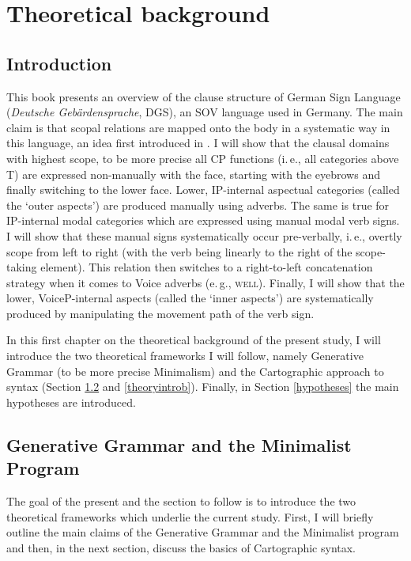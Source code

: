 \chapter{Theoretical background}\label{chaptertheoreticalbackground}
\section{Introduction}
This book presents an overview of the clause structure of German Sign Language (\textit{Deutsche Geb\"ardensprache}, DGS), an SOV language used in Germany. The main claim is that scopal relations are mapped onto the body in a systematic way in this language, an idea first introduced in \citet{bross2017scope}. I will show that the clausal domains with highest scope, to be more precise all CP functions (i.\,e., all categories above T) are expressed non-manually with the face, starting with the eyebrows and finally switching to the lower face. Lower, IP-internal aspectual categories (called the `outer aspects') are produced manually using adverbs. The same is true for IP-internal modal categories which are expressed using manual modal verb signs. I will show that these manual signs systematically occur pre-verbally, i.\,e., overtly scope from left to right (with the verb being linearly to the right of the scope-taking element). This relation then switches to a right-to-left concatenation strategy when it comes to Voice adverbs (e.\,g., \textsc{well}). Finally, I will show that the lower, VoiceP-internal aspects (called the `inner aspects') are systematically produced by manipulating the movement path of the verb sign. 

In this first chapter on the theoretical background of the present study, I will introduce the two theoretical frameworks I will follow, namely Generative Grammar (to be more precise Minimalism) and the Cartographic approach to syntax (Section \ref{theoryintroa} and \ref{theoryintrob}). Finally, in Section \ref{hypotheses} the main hypotheses are introduced.%



\section{Generative Grammar and the Minimalist Program}\label{theoryintroa}
The goal of the present and the section to follow is to introduce the two theoretical frameworks which underlie the current study. First, I will briefly outline the main claims of the Generative Grammar and the Minimalist program and then, in the next section, discuss the basics of Cartographic syntax. 

